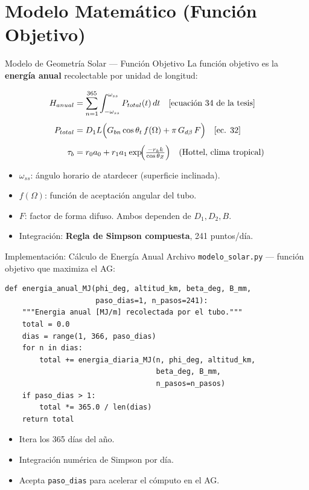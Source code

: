 \documentclass[10pt]{beamer}
\begin{document}
\section{Modelo Matemático (Función Objetivo)}
\begin{frame}{Modelo de Geometría Solar — Función Objetivo}
  La función objetivo es la \textbf{energía anual} recolectable por unidad de longitud:

  \begin{align*}
    H_{anual} &= \sum_{n=1}^{365}
      \int_{-\omega_{ss}}^{\omega_{ss}} P_{total}(t)\, dt
      \quad \text{[ecuación 34 de la tesis]}\\[4pt]
    P_{total} &= D_1 L \Bigl(G_{bn}\cos\theta_t\, f(\Omega)
                           + \pi\, G_{d\beta}\, F\Bigr)
      \quad \text{[ec. 32]}\\[4pt]
    \tau_b &= r_0 a_0 + r_1 a_1 \exp\!\Bigl(\tfrac{-r_k k}{\cos\theta_Z}\Bigr)
      \quad \text{(Hottel, clima tropical)}
  \end{align*}

  \vspace{0.2cm}
  \begin{itemize}
    \item $\omega_{ss}$: ángulo horario de atardecer (superficie inclinada).
    \item $f(\Omega)$: función de aceptación angular del tubo.
    \item $F$: factor de forma difuso. Ambos dependen de $D_1, D_2, B$.
    \item Integración: \textbf{Regla de Simpson compuesta}, 241 puntos/día.
  \end{itemize}
\end{frame}

\begin{frame}[fragile]{Implementación: Cálculo de Energía Anual}
  Archivo \texttt{modelo\_solar.py} — función objetivo que maximiza el AG:

  \begin{lstlisting}
def energia_anual_MJ(phi_deg, altitud_km, beta_deg, B_mm,
                     paso_dias=1, n_pasos=241):
    """Energia anual [MJ/m] recolectada por el tubo."""
    total = 0.0
    dias = range(1, 366, paso_dias)
    for n in dias:
        total += energia_diaria_MJ(n, phi_deg, altitud_km,
                                   beta_deg, B_mm,
                                   n_pasos=n_pasos)
    if paso_dias > 1:
        total *= 365.0 / len(dias)
    return total
  \end{lstlisting}

  \begin{itemize}
    \item Itera los 365 días del año.
    \item Integración numérica de Simpson por día.
    \item Acepta \texttt{paso\_dias} para acelerar el cómputo en el AG.
  \end{itemize}
\end{frame}
\end{document}
